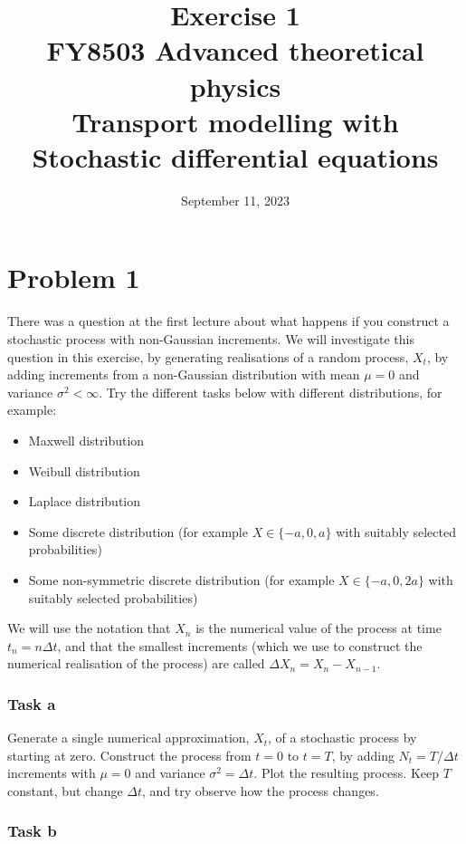 \documentclass[a4paper]{article}
\title{\vspace{-3em} Exercise 1\\[10pt] \large FY8503 Advanced theoretical physics\\  Transport modelling with Stochastic differential equations}
\author{September 11, 2023}
\date{}
\begin{document}
\maketitle

\section*{Problem 1}

There was a question at the first lecture about what happens if you construct a stochastic process with non-Gaussian increments. We will investigate this question in this exercise, by generating realisations of a random process, $X_t$, by adding increments from a non-Gaussian distribution with mean $\mu=0$ and variance $\sigma^2 < \infty$. Try the different tasks below with different distributions, for example:
\begin{itemize}
    \item Maxwell distribution
    \item Weibull distribution
    \item Laplace distribution
    \item Some discrete distribution (for example $X\in\{-a, 0, a\}$ with suitably selected probabilities)
    \item Some non-symmetric discrete distribution (for example $X\in\{-a, 0, 2a\}$ with suitably selected probabilities)
\end{itemize}

We will use the notation that $X_n$ is the numerical value of the process at time $t_n = n \Delta t$, and that the smallest increments (which we use to construct the numerical realisation of the process) are called $\Delta X_n = X_n - X_{n-1}$.

\subsubsection*{Task a}

Generate a single numerical approximation, $X_t$, of a stochastic process by starting at zero.
Construct the process from $t=0$ to $t=T$, by adding $N_t = T/\Delta t$ increments with $\mu=0$ and variance $\sigma^2 = \Delta t$. Plot the resulting process. Keep $T$ constant, but change $\Delta t$, and try observe how the process changes.

\subsubsection*{Task b}
\end{document}
